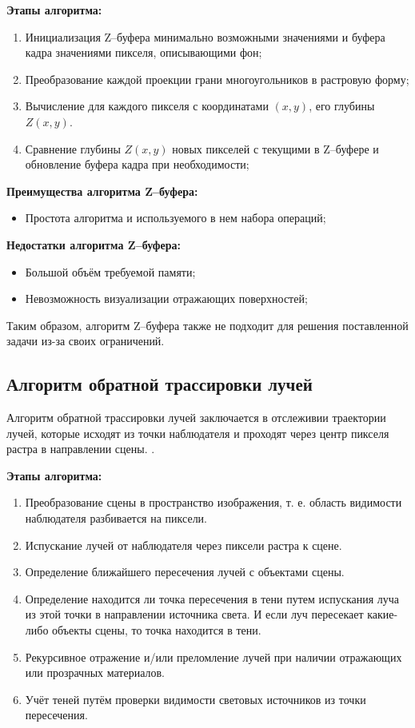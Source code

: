 \textbf{Этапы алгоритма:}
\begin{enumerate}[label=\arabic*)]
	\item Инициализация Z--буфера минимально возможными значениями и буфера кадра значениями пикселя, описывающими фон;
	\item Преобразование каждой проекции грани многоугольников в растровую форму;
	\item Вычисление для каждого пикселя с координатами $(x, y)$, его глубины $Z(x, y)$.
	\item Сравнение глубины $Z(x, y)$ новых пикселей с текущими в Z--буфере и обновление буфера кадра при необходимости;
\end{enumerate}

\textbf{Преимущества алгоритма Z--буфера:}
\begin{itemize}
	\item Простота алгоритма и используемого в нем набора операций;
\end{itemize}

\textbf{Недостатки алгоритма Z--буфера:}
\begin{itemize}
	\item Большой объём требуемой памяти;
	\item Невозможность визуализации отражающих поверхностей;
\end{itemize}

Таким образом, алгоритм Z--буфера также не подходит для решения поставленной задачи из-за своих ограничений.

\subsection*{Алгоритм обратной трассировки лучей}
Алгоритм обратной трассировки лучей заключается в отслеживии траектории лучей, которые исходят из точки наблюдателя и проходят через центр пикселя растра в направлении сцены. \cite{shikinDinamica}.

\textbf{Этапы алгоритма:}
\begin{enumerate}[label=\arabic*)]
	\item Преобразование сцены в пространство изображения, т. е. область видимости наблюдателя разбивается на пиксели.
	\item Испускание лучей от наблюдателя через пиксели растра к сцене.
	\item Определение ближайшего пересечения лучей с объектами сцены.
	\item Определение находится ли точка пересечения в тени путем испускания луча из этой точки в направлении источника света. И если луч пересекает какие-либо объекты сцены, то точка находится в тени.
	\item Рекурсивное отражение и/или преломление лучей при наличии отражающих или прозрачных материалов.
	\item Учёт теней путём проверки видимости световых источников из точки пересечения.
\end{enumerate}

